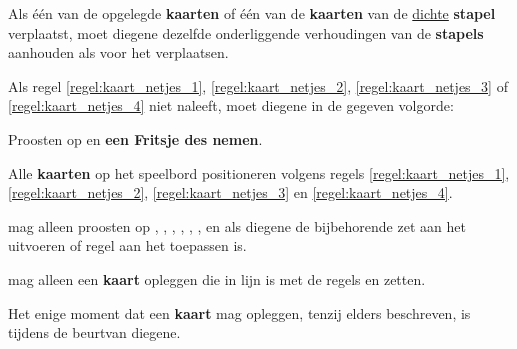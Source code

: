 \vervolgLijst{}
\item Als \eenSpeler één van de opgelegde \textbf{kaarten} of één van de \textbf{kaarten} van de \ul{dichte} \textbf{stapel} verplaatst, moet diegene dezelfde onderliggende verhoudingen van de \textbf{stapels} aanhouden als voor het verplaatsen.
\label{regel:kaart_netjes_4}
\eindLijst{}

\vervolgLijst{}
\item Als \eenSpeler regel \ref{regel:kaart_netjes_1}, \ref{regel:kaart_netjes_2}, \ref{regel:kaart_netjes_3} of \ref{regel:kaart_netjes_4} niet naleeft, moet diegene in de gegeven volgorde:
\puntLijst{}
\item Proosten op  en \textbf{een Fritsje des nemen}\footnotemark[3].
\item Alle \textbf{kaarten} op het speelbord positioneren volgens regels \ref{regel:kaart_netjes_1}, \ref{regel:kaart_netjes_2}, \ref{regel:kaart_netjes_3} en \ref{regel:kaart_netjes_4}.
\eindPuntLijst{}
\label{regel:kaart_netjes_terugleggen}
\eindLijst{}


\vervolgLijst{}
\item \EenSpeler mag alleen proosten op , , , , , ,  en  als diegene de bijbehorende zet aan het uitvoeren of regel aan het toepassen is\footnotemark[4].
\eindLijst{}

\footnotetext[1]{\footnoteEenDubbeleFritsNemen}
\footnotetext[3]{\footnoteFritsjeDesNemen}


\newpage
{}


\vervolgLijst{}
\item \EenSpeler mag alleen een \textbf{kaart} opleggen die in lijn is met de regels en zetten.
\label{regel:ongeldige_zet}
\eindLijst{}

\vervolgLijst{}
\item Het enige moment dat \eenSpeler een \textbf{kaart} mag opleggen, tenzij elders beschreven, is tijdens de beurt\footnotemark[1] van diegene.
\label{regel:voor_beurt_opleggen}
\eindLijst{}

